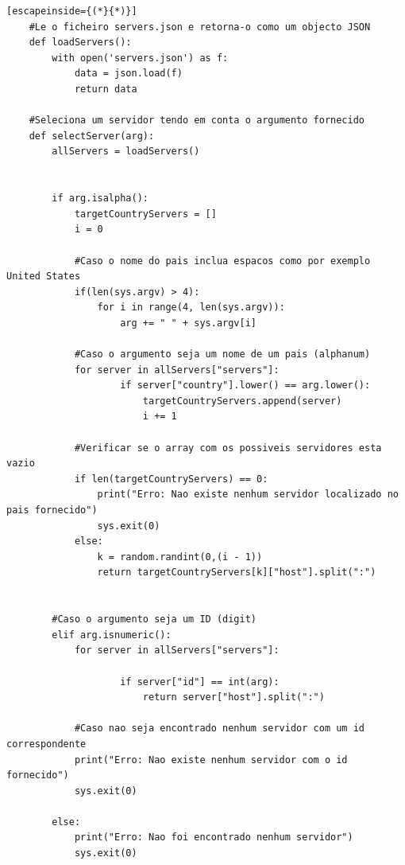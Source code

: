 \documentclass{report}
\begin{document}
\begin{lstlisting}[escapeinside={(*}{*)}]
    #Le o ficheiro servers.json e retorna-o como um objecto JSON 
    def loadServers():
        with open('servers.json') as f:
            data = json.load(f)
            return data
    
    #Seleciona um servidor tendo em conta o argumento fornecido
    def selectServer(arg):
        allServers = loadServers()
    
    
        if arg.isalpha():
            targetCountryServers = []
            i = 0
    
            #Caso o nome do pais inclua espacos como por exemplo United States
            if(len(sys.argv) > 4):
                for i in range(4, len(sys.argv)):
                    arg += " " + sys.argv[i]
                
            #Caso o argumento seja um nome de um pais (alphanum)
            for server in allServers["servers"]:
                    if server["country"].lower() == arg.lower():
                        targetCountryServers.append(server)
                        i += 1
            
            #Verificar se o array com os possiveis servidores esta vazio
            if len(targetCountryServers) == 0:
                print("Erro: Nao existe nenhum servidor localizado no pais fornecido")
                sys.exit(0)
            else:
                k = random.randint(0,(i - 1)) 
                return targetCountryServers[k]["host"].split(":")
        
    
        #Caso o argumento seja um ID (digit)
        elif arg.isnumeric():
            for server in allServers["servers"]:
                    
                    if server["id"] == int(arg):
                        return server["host"].split(":")
            
            #Caso nao seja encontrado nenhum servidor com um id correspondente
            print("Erro: Nao existe nenhum servidor com o id fornecido")
            sys.exit(0)
    
        else:
            print("Erro: Nao foi encontrado nenhum servidor")
            sys.exit(0)
\end{lstlisting}
\end{document}

